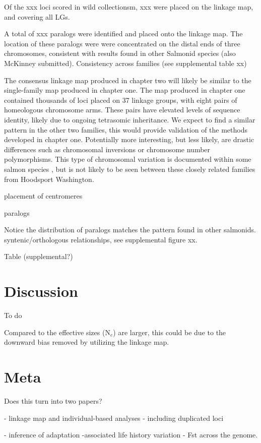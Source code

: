 \documentclass[12pt,  one column]{article}
\begin{document}
Of the xxx loci scored in wild collectionsm, xxx were placed on the linkage map, and covering all LGs. 

A total of xxx paralogs were identified and placed onto the linkage map.  The location of these paralogs were were concentrated on the distal ends of three chromosomes, consistent with results found in other Salmonid species  \citep{Brieuc2014, Kodama2014, Waples2015} (also McKinney submitted). Consistency across families (see supplemental table xx)

The consensus linkage map produced in chapter two will likely be similar to the single-family map produced in chapter one.  The map produced in chapter one contained thousands of loci placed on 37 linkage groups, with eight pairs of homeologous chromosome arms.  These pairs have elevated levels of sequence identity, likely due to ongoing tetrasomic inheritance.  We expect to find a similar pattern in the other two families, this would provide validation of the methods developed in chapter one. Potentially more interesting, but less likely, are drastic differences such as chromosomal inversions or chromosome number polymorphisms.  This type of chromosomal variation is documented within some salmon species \citep{Phillips2001}, but is not likely to be seen between these closely related families from Hoodsport Washington.

placement of centromeres

paralogs

Notice the distribution of paralogs matches the  pattern found in other salmonids.
syntenic/orthologous relationships, see supplemental figure xx.

Table (supplemental?)

\section*{Discussion}
To do

Compared to \citet{Small2014} the effective sizes (N$_{e}$) are larger, this could be due to the downward bias removed by utilizing the linkage map.

\section*{Meta}
Does this turn into two papers?

 - linkage map and individual-based analyses - including duplicated loci

 - inference of adaptation -associated  life history variation  - Fst across the genome.
\end{document}
